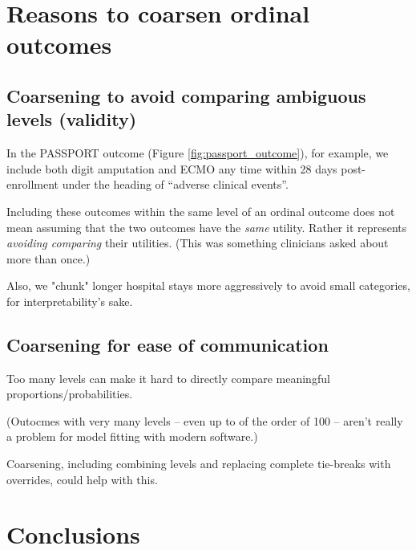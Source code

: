 \documentclass[
  11pt,
  fleqn
]{article}
\begin{document}
\section{Reasons to coarsen ordinal outcomes}

\subsection{Coarsening to avoid comparing ambiguous levels (validity)}

In the PASSPORT outcome (Figure \ref{fig:passport_outcome}), for
example, we include both digit
amputation and ECMO
any time within 28 days post-enrollment under the heading of
``adverse clinical events''.

Including these outcomes within the same level of an
ordinal outcome does not mean assuming that the two outcomes have the
\emph{same} utility. Rather it represents \emph{avoiding comparing}
their utilities. (This was something clinicians asked about more than once.)

Also, we "chunk" longer hospital stays more aggressively to avoid
small categories, for interpretability's sake.

\subsection{Coarsening for ease of communication}

Too many levels can make it hard to directly compare meaningful
proportions/probabilities.

(Outocmes with very many levels -- even up to of the order of 100 --
aren't really a problem for model fitting with modern software.)

Coarsening, including combining levels and replacing complete
tie-breaks with overrides, could help with this.

\section{Conclusions}

\newpage

\printbibliography
\end{document}
